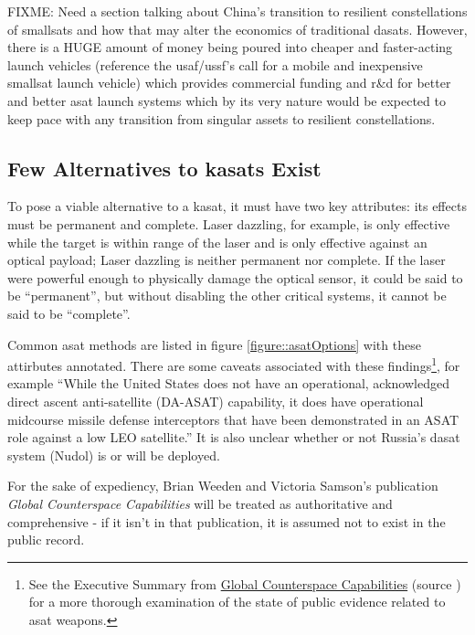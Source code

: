FIXME: Need a section talking about China's transition to resilient
constellations of smallsats and how that may alter the economics of
traditional dasats.  However, there is a HUGE amount of money being
poured into cheaper and faster-acting launch vehicles (reference the
usaf/ussf's call for a mobile and inexpensive smallsat launch vehicle)
which provides commercial funding and r\&d for better and better asat
launch systems which by its very nature would be expected to keep pace
with any transition from singular assets to resilient constellations.


\subsection{Few Alternatives to \acp{kasat} Exist}

To pose a viable alternative to a \ac{kasat}, it must have two key
attributes: its effects must be permanent and complete.  Laser
dazzling, for example, is only effective while the target is within
range of the laser and is only effective against an optical payload;
Laser dazzling is neither permanent nor complete.  If the laser were
powerful enough to physically damage the optical sensor, it could be
said to be ``permanent'', but without disabling the other critical
systems, it cannot be said to be ``complete''.

Common \ac{asat} methods are listed in figure
\ref{figure::asatOptions} with these attirbutes annotated.  There are
some caveats associated with these findings\footnote{See the Executive
Summary from
\href{https://swfound.org/media/207344/swf_global_counterspace_capabilities_2022.pdf}{Global
  Counterspace Capabilities} (source \cite{brian}) for a more thorough
examination of the state of public evidence related to \acl{asat}
weapons.}, for example ``While the United States does not have an
operational, acknowledged direct ascent anti-satellite (DA-ASAT)
capability, it does have operational midcourse missile defense
interceptors that have been demonstrated in an ASAT role against a low
LEO satellite.''\cite[pxiii]{brian} It is also unclear whether or not
Russia's \ac{dasat} system (Nudol) is or will be
deployed.\cite[pxv]{brian}

For the sake of expediency, Brian Weeden and Victoria Samson's
publication {\it Global Counterspace Capabilities}\cite{brian} will be
treated as authoritative and comprehensive - if it isn't in that
publication, it is assumed not to exist in the public record.

